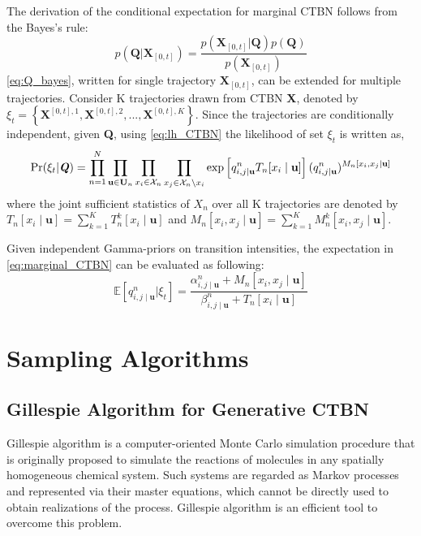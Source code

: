 The derivation of the conditional expectation for marginal CTBN follows from the Bayes's rule:
\begin{equation}
p\left(\textbf{Q} | \textbf{X}_{[0,t]}\right)=\frac{p\left(\textbf{X}_{[0,t]} | \textbf{Q}\right) p(\textbf{Q})}{p\left(\textbf{X}_{[0,t]}\right)}
\label{eq:Q_bayes}
\end{equation}
\autoref{eq:Q_bayes}, written for single trajectory $ \textbf{X}_{[0,t]} $, can be extended for multiple trajectories. Consider K trajectories drawn from CTBN \textbf{X}, denoted by $ \xi_t = \left\lbrace \textbf{X}^{[0,t], 1}, \textbf{X}^{[0,t], 2}, ..., \textbf{X}^{[0,t], K} \right\rbrace  $. Since the trajectories are conditionally independent, given \textbf{Q}, using \autoref{eq:lh_CTBN} the likelihood of set $ \xi_t $ is written as,
\begin{align}
\operatorname{Pr}( \xi_t  | \textbf{\textit{Q}} ) = \prod_{n=1}^{N} \prod_{\textbf{u} \in \mathcal{\textbf{U}}_{n}} \prod_{x_i \in \mathcal{X}_{n}} \prod_{x_j \in \mathcal{X}_{n} \backslash x_i}
\exp \left[q_{i,j\mid \textbf{u}}^{n} T_{n}[x_i\mid \textbf{u}]\right] (q_{i,j\mid \textbf{u}}^{n})^{M_{n}[x_i, x_j\mid \textbf{u}]}
\label{eq:lh_dataset_CTBN}
\end{align}
where the joint sufficient statistics of $ X_n $ over all K trajectories are denoted by  $ T_{n}[x_i\mid \textbf{u}] = \sum_{k=1}^{K} T_{n}^k[x_i\mid \textbf{u}] $ and $ M_{n}[x_i, x_j\mid \textbf{u}] =\sum_{k=1}^{K} M_{n}^k[x_i, x_j\mid \textbf{u}]$.

Given independent Gamma-priors on transition intensities, the expectation in \autoref{eq:marginal_CTBN} can be evaluated as following:
\begin{equation}
	\mathbb{E}\left[q_{i,j\mid \textbf{u}}^{n} | \xi_{t}\right]=\frac{\alpha^n_{i,j\mid \textbf{u}}+M_{n}[x_i, x_j\mid \textbf{u}]}{\beta^n_{i,j\mid \textbf{u}}+T_{n}[x_i \mid \textbf{u}]}
\end{equation}

\section{Sampling Algorithms}
\label{sec:sampling_alg}
\subsection{Gillespie Algorithm for Generative CTBN}
Gillespie algorithm is a computer-oriented Monte Carlo simulation procedure that is originally proposed to simulate the reactions of molecules in any spatially homogeneous chemical system. Such systems are regarded as Markov processes and represented via their master equations, which cannot be directly used to obtain realizations of the process. Gillespie algorithm is an efficient tool to overcome this problem. \cite{Gillespie1976}


